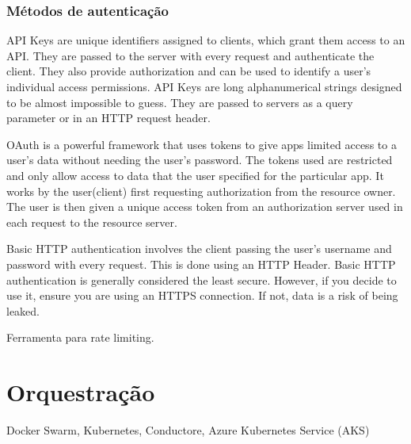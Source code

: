 \subsubsection{Métodos de autenticação}

API Keys are unique identifiers assigned to clients, which grant them access to an API. They are passed to the server with every request and authenticate the client. They also provide authorization and can be used to identify a user's individual access permissions. API Keys are long alphanumerical strings designed to be almost impossible to guess. They are passed to servers as a query parameter or in an HTTP request header.

OAuth is a powerful framework that uses tokens to give apps limited access to a user’s data without needing the user’s password. The tokens used are restricted and only allow access to data that the user specified for the particular app. It works by the user(client) first requesting authorization from the resource owner. The user is then given a unique access token from an authorization server used in each request to the resource server.

Basic HTTP authentication involves the client passing the user’s username and password with every request. This is done using an HTTP Header. Basic HTTP authentication is generally considered the least secure. However, if you decide to use it, ensure you are using an HTTPS connection. If not, data is a risk of being leaked.

Ferramenta para rate limiting. \cite{rapidAPI-twitter}

\section{Orquestração}

Docker Swarm, Kubernetes, Conductore, Azure Kubernetes Service (AKS)




